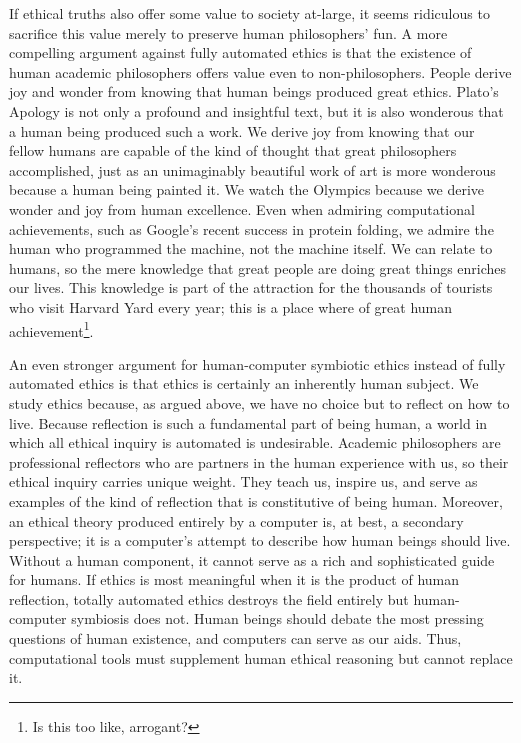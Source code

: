 \begin{isabellebody}
\begin{isamarkuptext}
If ethical truths also offer some value to society at-large, it seems ridiculous to sacrifice this 
value merely to preserve human philosophers’ fun. A more compelling argument against fully automated 
ethics is that the existence of human academic philosophers offers value even to non-philosophers. 
People derive joy and wonder from knowing that human beings produced great ethics. Plato’s Apology 
is not only a profound and insightful text, but it is also wonderous that a human being produced such 
a work. We derive joy from knowing that our fellow humans are capable of the kind of thought that 
great philosophers accomplished, just as an unimaginably beautiful work of art is more wonderous 
because a human being painted it. We watch the Olympics because we derive wonder and joy from human 
excellence. Even when admiring computational achievements, such as Google’s recent success in protein 
folding, we admire the human who programmed the machine, not the machine itself. We can relate to 
humans, so the mere knowledge that great people are doing great things enriches our lives. This 
knowledge is part of the attraction for the thousands of tourists who visit Harvard Yard every year; 
this is a place where of great human achievement\footnote{Is this too like, arrogant?}.

An even stronger argument for human-computer symbiotic ethics instead of fully automated ethics is 
that ethics is certainly an inherently human subject. We study ethics because, as argued above, we 
have no choice but to reflect on how to live. Because reflection is such a fundamental part of being 
human, a world in which all ethical inquiry is automated is undesirable. Academic philosophers are 
professional reflectors who are partners in the human experience with us, so their ethical inquiry 
carries unique weight. They teach us, inspire us, and serve as examples of the kind of reflection 
that is constitutive of being human. Moreover, an ethical theory produced entirely by a computer is, 
at best, a secondary perspective; it is a computer’s attempt to describe how human beings should live. 
Without a human component, it cannot serve as a rich and sophisticated guide for humans. If ethics is 
most meaningful when it is the product of human reflection, totally automated ethics destroys the field 
entirely but human-computer symbiosis does not. Human beings should debate the most pressing questions 
of human existence, and computers can serve as our aids. Thus, computational tools must supplement 
human ethical reasoning but cannot replace it.


\end{isamarkuptext}
\end{isabellebody}
